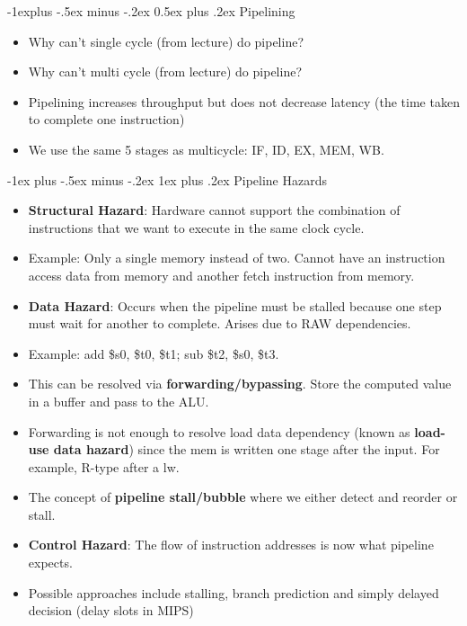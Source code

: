 \documentclass[8pt, landscape]{extarticle}
\makeatletter
\renewcommand{\subsection}{\@startsection{subsection}{2}{0mm}%
  {-1explus -.5ex minus -.2ex}%
  {0.5ex plus .2ex}%
{\normalfont\normalsize\bfseries}}
\renewcommand{\subsubsection}{\@startsection{subsubsection}{3}{0mm}%
  {-1ex plus -.5ex minus -.2ex}%
  {1ex plus .2ex}%
{\normalfont\small\bfseries}}%
\makeatother
\begin{document}
\begin{multicols*}{4}
\begin{itemize}
      \end{itemize}

  \subsection{Pipelining}
      \begin{itemize}
        \item Why can't single cycle (from lecture) do pipeline?
        \item Why can't multi cycle (from lecture) do pipeline?
        \item Pipelining increases throughput but does not decrease latency (the time taken to complete one instruction)
        \item We use the same 5 stages as multicycle: IF, ID, EX, MEM, WB.
      \end{itemize}

    \subsubsection{Pipeline Hazards}
      \begin{itemize}
        \item \textbf{Structural Hazard}: Hardware cannot support the combination of instructions that we want to execute in the same clock cycle.
        \item Example: Only a single memory instead of two. Cannot have an instruction access data from memory and another fetch instruction from memory.
        \item \textbf{Data Hazard}: Occurs when the pipeline must be stalled because one step must wait for another to complete. Arises due to RAW dependencies.
        \item Example: add \$s0, \$t0, \$t1; sub \$t2, \$s0, \$t3. 
        \item This can be resolved via \textbf{forwarding/bypassing}. Store the computed value in a buffer and pass to the ALU.
        \item Forwarding is not enough to resolve load data dependency (known as \textbf{load-use data hazard}) since the mem is written one stage after the input. For example, R-type after a lw.
        \item The concept of \textbf{pipeline stall/bubble} where we either detect and reorder or stall.
        \item \textbf{Control Hazard}: The flow of instruction addresses is now what pipeline expects.
        \item Possible approaches include stalling, branch prediction and simply delayed decision (delay slots in MIPS)
      \end{itemize}


  
\end{multicols*}
\end{document}
